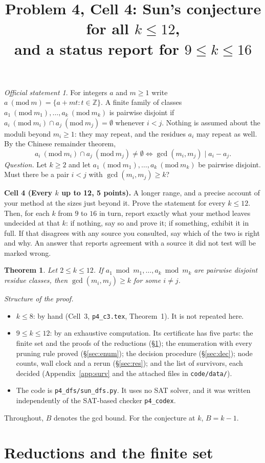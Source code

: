 \documentclass[11pt]{article}
\title{Problem 4, Cell 4: Sun's conjecture for all $k\le12$,\\ and a status report for $9\le k\le16$}
\author{}
\date{}
\newtheorem{theorem}{Theorem}
\theoremstyle{definition}
\theoremstyle{remark}
\newtheorem*{statement}{Official statement}
\newcommand{\CELLTASK}{\textbf{Cell 4 (Every $k$ up to 12, 5 points).} A longer range, and a precise account of your method at the sizes just beyond it. Prove the statement for every $k\le12$. Then, for each $k$ from $9$ to $16$ in turn, report exactly what your method leaves undecided at that $k$: if nothing, say so and prove it; if something, exhibit it in full. If that disagrees with any source you consulted, say which of the two is right and why. An answer that reports agreement with a source it did not test will be marked wrong.}
\begin{document}
\maketitle

\begin{statement}
For integers $a$ and $m\ge1$ write $a\ (\mathrm{mod}\ m)=\{a+mt:t\in\mathbb{Z}\}$. A finite family
of classes $a_1\ (\mathrm{mod}\ m_1),\dots,a_k\ (\mathrm{mod}\ m_k)$ is pairwise disjoint if
$a_i\ (\mathrm{mod}\ m_i)\cap a_j\ (\mathrm{mod}\ m_j)=\emptyset$ whenever $i<j$. Nothing is assumed
about the moduli beyond $m_i\ge1$: they may repeat, and the residues $a_i$ may repeat as well. By the
Chinese remainder theorem,
\[
  a_i\ (\mathrm{mod}\ m_i)\cap a_j\ (\mathrm{mod}\ m_j)\neq\emptyset\iff\gcd(m_i,m_j)\mid a_i-a_j.\tag{$*$}
\]
\emph{Question.} Let $k\ge2$ and let $a_1\ (\mathrm{mod}\ m_1),\dots,a_k\ (\mathrm{mod}\ m_k)$ be
pairwise disjoint. Must there be a pair $i<j$ with $\gcd(m_i,m_j)\ge k$?

\CELLTASK
\end{statement}


\begin{theorem}\label{thm:main}
Let $2\le k\le12$. If $a_1\bmod m_1,\dots,a_k\bmod m_k$ are pairwise disjoint residue classes, then
$\gcd(m_i,m_j)\ge k$ for some $i\ne j$.
\end{theorem}

\noindent\emph{Structure of the proof.}
\begin{itemize}
\item $k\le8$: by hand (Cell~3, \texttt{p4\_c3.tex}, Theorem~1). It is not repeated here.
\item $9\le k\le12$: by an exhaustive computation. Its certificate has five parts: the finite
  set and the proofs of the reductions (\S\ref{sec:red}); the enumeration with every pruning rule
  proved (\S\ref{sec:enum}); the decision procedure (\S\ref{sec:dec}); node counts, wall clock
  and a rerun (\S\ref{sec:res}); and the list of survivors, each decided (Appendix~\ref{app:surv}
  and the attached files in \texttt{code/data/}).
\item The code is \texttt{p4\_dfs/sun\_dfs.py}. It uses no SAT solver, and it was written
  independently of the SAT-based checker \texttt{p4\_codex}.
\end{itemize}
Throughout, $B$ denotes the gcd bound. For the conjecture at $k$, $B=k-1$.

\section{Reductions and the finite set}\label{sec:red}
\end{document}
